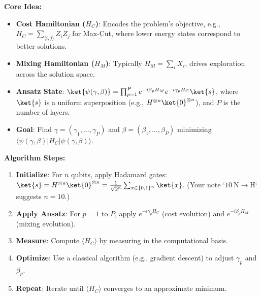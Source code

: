 \noindent
\textbf{Core Idea:}
\begin{itemize}
  \item \textbf{Cost Hamiltonian ($H_C$)}: Encodes the problem’s objective,
    e.g., $H_C = \sum_{\langle i,j \rangle} Z_i Z_j$ for Max-Cut, where lower
    energy states correspond to better solutions.

  \item \textbf{Mixing Hamiltonian ($H_M$)}: Typically $H_M = \sum_i X_i$,
    drives exploration across the solution space.

  \item \textbf{Ansatz State}: $\ket{\psi(\gamma, \beta)} = \prod_{p=1}^P
    e^{-i\beta_p H_M} e^{-i\gamma_p H_C} \ket{s}$, where $\ket{s}$ is a
    uniform superposition (e.g., $H^{\otimes n} \ket{0}^{\otimes n}$), and
    $P$ is the number of layers.

  \item \textbf{Goal}: Find $\gamma = (\gamma_1, \ldots, \gamma_P)$ and
    $\beta = (\beta_1, \ldots, \beta_P)$ minimizing $\langle \psi(\gamma,
    \beta) | H_C | \psi(\gamma, \beta) \rangle$.

\end{itemize}

\vspace{0.3cm}

\noindent
\textbf{Algorithm Steps:}
\begin{enumerate}
  \item \textbf{Initialize}: For $n$ qubits, apply Hadamard gates: $\ket{s} =
    H^{\otimes n} \ket{0}^{\otimes n} = \frac{1}{\sqrt{2^n}} \sum_{x \in
    \{0,1\}^n} \ket{x}$. (Your note `$10 \mathrm{~N} \rightarrow \mathrm{H}$`
    suggests $n=10$.)

  \item \textbf{Apply Ansatz}: For $p=1$ to $P$, apply $e^{-i\gamma_p H_C}$
    (cost evolution) and $e^{-i\beta_p H_M}$ (mixing evolution).

  \item \textbf{Measure}: Compute $\langle H_C \rangle$ by measuring in the
    computational basis.

  \item \textbf{Optimize}: Use a classical algorithm (e.g., gradient descent)
    to adjust $\gamma_p$ and $\beta_p$.

  \item \textbf{Repeat}: Iterate until $\langle H_C \rangle$ converges to an
    approximate minimum.

\end{enumerate}

